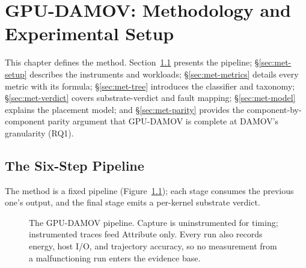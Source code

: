 \chapter{GPU-DAMOV: Methodology and Experimental Setup}
\label{ch:method}

This chapter defines the method. Section~\ref{sec:met-pipeline} presents the pipeline; \S\ref{sec:met-setup} describes the instruments and workloads; \S\ref{sec:met-metrics} details every metric with its formula; \S\ref{sec:met-tree} introduces the classifier and taxonomy; \S\ref{sec:met-verdict} covers substrate-verdict and fault mapping; \S\ref{sec:met-model} explains the placement model; and \S\ref{sec:met-parity} provides the component-by-component parity argument that GPU-DAMOV is complete at DAMOV's granularity (RQ1).

\section{The Six-Step Pipeline}
\label{sec:met-pipeline}

The method is a fixed pipeline (Figure~\ref{fig:pipeline}); each stage consumes
the previous one's output, and the final stage emits a per-kernel substrate
verdict.

\begin{figure}[t]
\centering
{}
\caption[The GPU-DAMOV six-step pipeline.]{The GPU-DAMOV pipeline. Capture is
uninstrumented for timing; instrumented traces feed Attribute only. Every run
also records energy, host I/O, and trajectory accuracy, so no measurement from a
malfunctioning run enters the evidence base.}
\label{fig:pipeline}
\end{figure}

